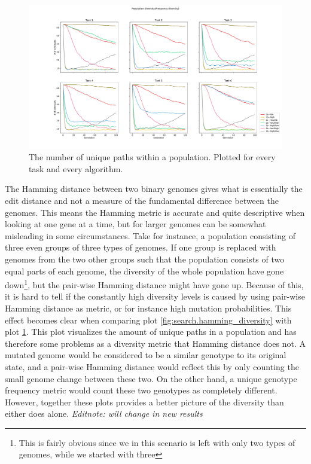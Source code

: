 \begin{figure}[p!]%
    \includegraphics[width=1.2\textwidth,center]{Chapters/Experiments/search_algo/figures/frequency_diversity_unique_path_count.pdf}
    \caption{The number of unique paths within a population. Plotted for every task and every algorithm.}
    \label{fig:search.frequency_diversity_unique}
\end{figure}

The Hamming distance between two binary genomes gives what is essentially the edit distance and not a measure of the fundamental difference between the genomes. This means the Hamming metric is accurate and quite descriptive when looking at one gene at a time, but for larger genomes can be somewhat misleading in some circumstances. Take for instance, a population consisting of three even groups of three types of genomes. If one group is replaced with genomes from the two other groups such that the population consists of two equal parts of each genome, the diversity of the whole population have gone down\footnote{This is fairly obvious since we in this scenario is left with only two types of genomes, while we started with three}, but the pair-wise Hamming distance might have gone up. Because of this, it is hard to tell if the constantly high diversity levels is caused by using pair-wise Hamming distance as metric, or for instance high mutation probabilities. This effect becomes clear when comparing plot \ref{fig:search.hamming_diversity} with plot \ref{fig:search.frequency_diversity_unique}. This plot visualizes the amount of unique paths in a population and has therefore some problems as a diversity metric that Hamming distance does not. A mutated genome would be considered to be a similar genotype to its original state, and a pair-wise Hamming distance would reflect this by only counting the small genome change between these two. On the other hand, a unique genotype frequency metric would count these two genotypes as completely different. However, together these plots provides a better picture of the diversity than either does alone. \textit{Editnote: will change in new results}

